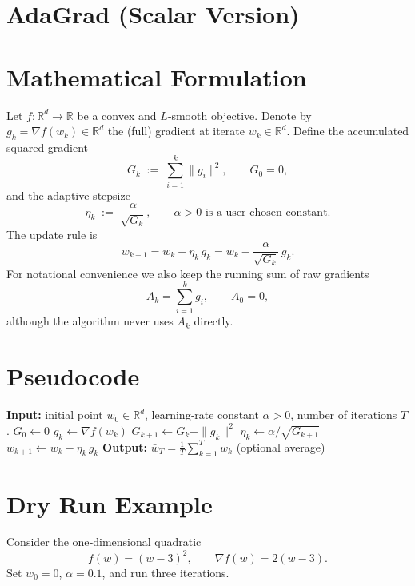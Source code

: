 \documentclass{article}
\begin{document}
\section*{AdaGrad (Scalar Version)}

\section*{Mathematical Formulation}
Let $f:\mathbb{R}^{d}\to\mathbb{R}$ be a convex and $L$‑smooth objective.  
Denote by $g_{k}= \nabla f(w_{k})\in\mathbb{R}^{d}$ the (full) gradient at iterate $w_{k}\in\mathbb{R}^{d}$.  
Define the accumulated squared gradient
\[
G_{k}\;:=\;\sum_{i=1}^{k} \|g_{i}\|^{2},\qquad G_{0}=0,
\]
and the adaptive stepsize
\[
\eta_{k}\;:=\;\frac{\alpha}{\sqrt{G_{k}}},\qquad \alpha>0\text{ is a user‑chosen constant.}
\]
The update rule is
\[
\boxed{w_{k+1}=w_{k}-\eta_{k}\,g_{k}
      =w_{k}-\frac{\alpha}{\sqrt{G_{k}}}\,g_{k}}.
\]
For notational convenience we also keep the running sum of raw gradients
\[
A_{k}= \sum_{i=1}^{k} g_{i},\qquad A_{0}=0,
\]
although the algorithm never uses $A_{k}$ directly.

\section*{Pseudocode}
\begin{algorithm}[H]
\caption{Scalar AdaGrad}
\begin{algorithmic}[1]
\STATE \textbf{Input:} initial point $w_{0}\in\mathbb{R}^{d}$, 
        learning‑rate constant $\alpha>0$, number of iterations $T$.
\STATE $G_{0}\gets 0$ 
    \STATE $g_{k}\gets \nabla f(w_{k})$
    \STATE $G_{k+1}\gets G_{k}+ \|g_{k}\|^{2}$
    \STATE $\eta_{k}\gets \alpha/\sqrt{G_{k+1}}$
    \STATE $w_{k+1}\gets w_{k}-\eta_{k}\,g_{k}$
\ENDFOR
\STATE \textbf{Output:} $\bar w_{T}= \frac{1}{T}\sum_{k=1}^{T} w_{k}$ (optional average)
\end{algorithmic}
\end{algorithm}

\section*{Dry Run Example}
Consider the one‑dimensional quadratic 
\[
f(w)=(w-3)^{2},\qquad \nabla f(w)=2(w-3).
\]
Set $w_{0}=0$, $\alpha=0.1$, and run three iterations.
\end{document}

